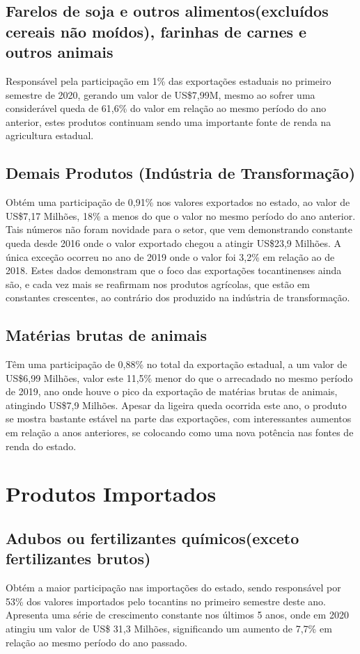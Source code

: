 \subsection {Farelos de soja e outros alimentos(excluídos cereais não moídos), farinhas de carnes e outros animais}
Responsável pela participação em 1\% das exportações estaduais no primeiro semestre de 2020, gerando um valor de US\$7,99M, mesmo ao sofrer uma considerável queda de 61,6\% do valor em relação ao mesmo período do ano anterior, estes produtos continuam sendo uma importante fonte de renda na agricultura estadual. 

\subsection {Demais Produtos (Indústria de Transformação)}
\par Obtém uma participação de 0,91\% nos valores exportados no estado, ao valor de US\$7,17 Milhões, 18\% a menos do que o valor no mesmo período do ano anterior. Tais números não foram novidade para o setor, que vem demonstrando constante queda desde 2016 onde o valor exportado chegou a atingir US\$23,9 Milhões. A única exceção ocorreu no ano de 2019 onde o valor foi 3,2\% em relação ao de 2018. Estes dados demonstram que o foco das exportações tocantinenses ainda são, e cada vez mais se reafirmam nos produtos agrícolas, que estão em constantes crescentes, ao contrário dos produzido na indústria de transformação. 

\subsection{Matérias brutas de animais}
\par Têm uma participação de 0,88\% no total da exportação estadual, a um valor de US\$6,99 Milhões, valor este 11,5\% menor do que o arrecadado no mesmo período de 2019, ano onde houve o pico da exportação de matérias brutas de animais, atingindo US\$7,9 Milhões. Apesar da ligeira queda ocorrida este ano, o produto se mostra bastante estável na parte das exportações, com interessantes aumentos em relação a anos anteriores, se colocando como uma nova potência nas fontes de renda do estado.

\section{Produtos Importados}

\subsection{Adubos ou fertilizantes químicos(exceto fertilizantes brutos)}
\par Obtém a maior participação nas importações do estado, sendo responsável por 53\% dos valores importados pelo tocantins no primeiro semestre deste ano. Apresenta uma série de crescimento constante nos últimos 5 anos, onde em 2020 atingiu um valor de US\$ 31,3 Milhões, significando um aumento de 7,7\% em relação ao mesmo período do ano passado.

